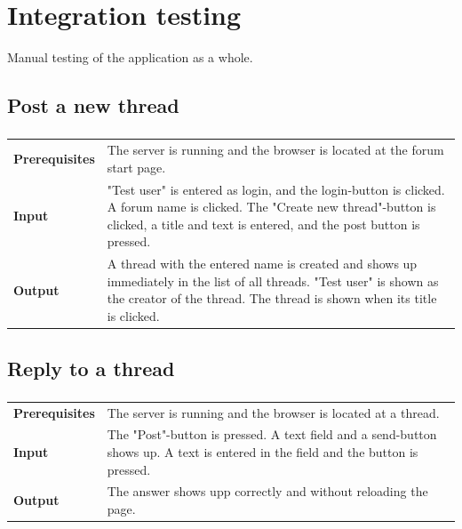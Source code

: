 \documentclass[a4paper, 12pt, titlepage]{article}
\newcommand{\ptestcase}[3]{
	\subsubsection{}
	\begin{tabular}{l p{10cm}}
	\bf{Prerequisites} & 
		#1\\
	\bf{Input} & 
		#2\\
	\bf{Output} & 
		#3\\
	\end{tabular}
}
\begin{document}
	\section{Integration testing}
	Manual testing of the application as a whole.

	\subsection{Post a new thread}
		\ptestcase{
			The server is running and the browser is located at the forum start page.
		}{
			"Test user" is entered as login, and the login-button is clicked.
			A forum name is clicked. The "Create new thread"-button is clicked, a title and text is entered, and the post button is pressed. 
		}{
			A thread with the entered name is created and shows up immediately in the list of all threads. "Test user" is shown as the creator of the thread. The thread is shown when its title is clicked.
		}


	\subsection{Reply to a thread}
		\ptestcase{
			The server is running and the browser is located at a thread.
		}{
			The "Post"-button is pressed. A text field and a send-button shows up. A text is entered in the field and the button is pressed.
		}{
			The answer shows upp correctly and without reloading the page.
		}
\end{document}
